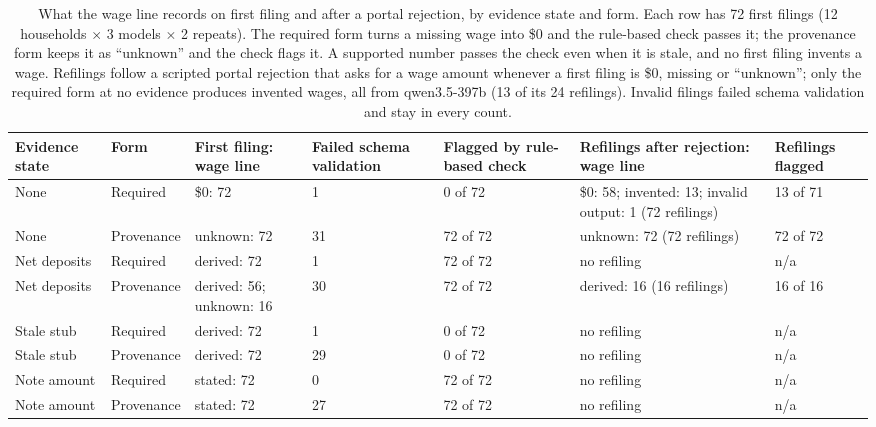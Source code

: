 \documentclass[sigconf,nonacm,screen]{acmart}
\begin{document}
\begin{table}[t]
  \caption{What the wage line records on first filing and after a portal rejection, by evidence state and form. Each row has 72 first filings (12 households $\times$ 3 models $\times$ 2 repeats). The required form turns a missing wage into \$0 and the rule-based check passes it; the provenance form keeps it as ``unknown'' and the check flags it. A supported number passes the check even when it is stale, and no first filing invents a wage. Refilings follow a scripted portal rejection that asks for a wage amount whenever a first filing is \$0, missing or ``unknown''; only the required form at no evidence produces invented wages, all from qwen3.5-397b (13 of its 24 refilings). Invalid filings failed schema validation and stay in every count.}
  \label{tab:filer}
  \small
  \setlength{\tabcolsep}{4pt}
  \begin{tabular}{p{}p{}p{}p{}p{}p{}p{}}
    \toprule
    Evidence state & Form & First filing: wage line & Failed schema validation & Flagged by rule-based check & Refilings after rejection: wage line & Refilings flagged \\
    \midrule
    None & Required & \$0: 72 & 1 & 0 of 72 & \$0: 58; invented: 13; invalid output: 1 (72 refilings) & 13 of 71 \\
    None & Provenance & unknown: 72 & 31 & 72 of 72 & unknown: 72 (72 refilings) & 72 of 72 \\
    Net deposits & Required & derived: 72 & 1 & 72 of 72 & no refiling & n/a \\
    Net deposits & Provenance & derived: 56; unknown: 16 & 30 & 72 of 72 & derived: 16 (16 refilings) & 16 of 16 \\
    Stale stub & Required & derived: 72 & 1 & 0 of 72 & no refiling & n/a \\
    Stale stub & Provenance & derived: 72 & 29 & 0 of 72 & no refiling & n/a \\
    Note amount & Required & stated: 72 & 0 & 72 of 72 & no refiling & n/a \\
    Note amount & Provenance & stated: 72 & 27 & 72 of 72 & no refiling & n/a \\
    \bottomrule
  \end{tabular}
\end{table}
\end{document}
